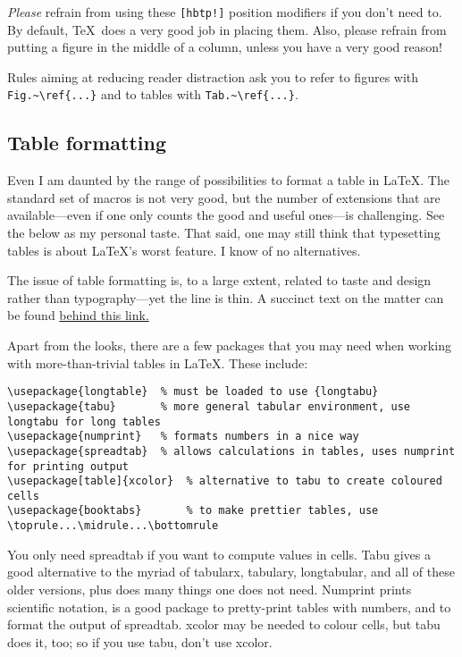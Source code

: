 \documentclass{article}
\begin{document}
\textsl{Please} refrain from using these \verb+[hbtp!]+ position modifiers if you don't need to.  By default, \TeX\ does a very good job in placing them.  Also, please refrain from putting a figure in the middle of a column, unless you have a very good reason!

Rules aiming at reducing reader distraction ask you to refer to figures with \verb+Fig.~\ref{...}+ and to tables with \verb+Tab.~\ref{...}+.

\subsection{Table formatting}
Even I am daunted by the range of possibilities to format a table in \LaTeX. The standard set of macros is not very good, but the number of extensions that are available---even if one only counts the good and useful ones---is challenging. See the below as my personal taste.  That said, one may still think that typesetting tables is about \LaTeX's worst feature.  I know of no alternatives.

The issue of table formatting is, to a large extent, related to taste and design rather than typography---yet the line is thin.  A succinct text on the matter can be found \href{http://users.ece.cmu.edu/~pueschel/teaching/guides/guide-tables.pdf}{behind this link.}

Apart from the looks, there are a few packages that you may need when working with more-than-trivial tables in \LaTeX.  These include:
\begin{verbatim}
\usepackage{longtable}	% must be loaded to use {longtabu}
\usepackage{tabu}		% more general tabular environment, use longtabu for long tables
\usepackage{numprint}	% formats numbers in a nice way
\usepackage{spreadtab}	% allows calculations in tables, uses numprint for printing output
\usepackage[table]{xcolor}	% alternative to tabu to create coloured cells
\usepackage{booktabs}		% to make prettier tables, use \toprule...\midrule...\bottomrule
\end{verbatim}
You only need spreadtab if you want to compute values in cells.  Tabu gives a good alternative to the myriad of tabularx, tabulary, longtabular, and all of these older versions, plus does many things one does not need.  Numprint prints scientific notation, is a good package to pretty-print tables with numbers, and to format the output of spreadtab.  xcolor may be needed to colour cells, but tabu does it, too; so if you use tabu, don't use xcolor.
\end{document}

